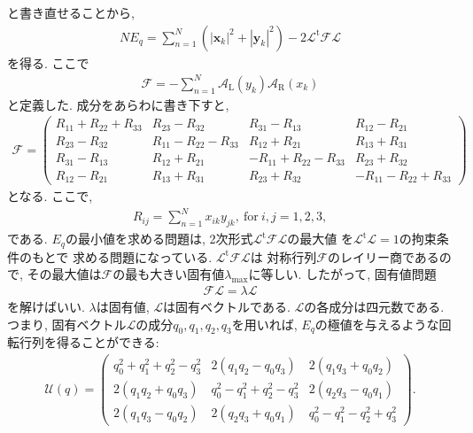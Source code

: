 と書き直せることから, 
\begin{align}
 NE_{q} = \sum_{n=1}^{N} (|\mathbf{x}_{k}|^{2} + |\mathbf{y}_{k}|^{2})
         - 2\mathcal{L}^{\mathrm{t}} \mathcal{F} \mathcal{L}
\end{align}
を得る. ここで
\begin{align}
 \mathcal{F} = - \sum_{n=1}^{N} 
                 \mathcal{A}_{\mathrm{L}} (y_{k})
                 \mathcal{A}_{\mathrm{R}} (x_{k})
\end{align}
と定義した. 成分をあらわに書き下すと,
\begin{align}
 \mathcal{F}
=
 \left(
   \begin{array}{cccc}
    R_{11} + R_{22} + R_{33} & R_{23} - R_{32} & R_{31} - R_{13} & R_{12} - R_{21}  \\
    R_{23} - R_{32} & R_{11} - R_{22} - R_{33} & R_{12} + R_{21} & R_{13} + R_{31}  \\
    R_{31} - R_{13} & R_{12} + R_{21} & -R_{11} + R_{22} - R_{33} & R_{23} + R_{32} \\
    R_{12} - R_{21} & R_{13} + R_{31} & R_{23} + R_{32} & -R_{11} - R_{22} + R_{33}
   \end{array}
 \right)
\end{align}
となる. ここで, 
\begin{align}
 R_{ij} = \sum_{n=1}^{N} x_{ik} y_{jk}, ~ \mathrm{for}~i,j = 1,2,3,
\end{align}
である.
$E_{q}$の最小値を求める問題は, 
2次形式$\mathcal{L}^{\mathrm{t}} \mathcal{F} \mathcal{L}$の最大値
を$\mathcal{L}^{\mathrm{t}}\mathcal{L}=1$の拘束条件のもとで
求める問題になっている. 
$\mathcal{L}^{\mathrm{t}} \mathcal{F} \mathcal{L}$は
対称行列$\mathcal{F}$のレイリー商であるので, 
その最大値は$\mathcal{F}$の最も大きい固有値$\lambda_{\mathrm{max}}$に等しい.
したがって, 固有値問題
\begin{align}
 \mathcal{F} \mathcal{L} = \lambda \mathcal{L}
\end{align}
を解けばいい.
$\lambda$は固有値, $\mathcal{L}$は固有ベクトルである.
$\mathcal{L}$の各成分は四元数である.
つまり, 固有ベクトル$\mathcal{L}$の成分$q_{0}, q_{1}, q_{2}, q_{3}$を用いれば, $E_{q}$の極値を与えるような回転行列を得ることができる:
\begin{align}
  \mathcal{U}(q)
 =
  \left(
    \begin{array}{ccc}
       q_{0}^{2} + q_{1}^{2} + q_{2}^{2} - q_{3}^{2} 
     & 2(q_{1} q_{2} - q_{0} q_{3})
     & 2(q_{1} q_{3} + q_{0} q_{2})
     \\
       2(q_{1} q_{2} + q_{0} q_{3})
     & q_{0}^{2} - q_{1}^{2} + q_{2}^{2} - q_{3}^{2} 
     & 2(q_{2} q_{3} - q_{0} q_{1})
     \\
       2(q_{1} q_{3} - q_{0} q_{2})
     & 2(q_{2} q_{3} + q_{0} q_{1})
     & q_{0}^{2} - q_{1}^{2} - q_{2}^{2} + q_{3}^{2} 
    \end{array}
 \right).
 \end{align}
